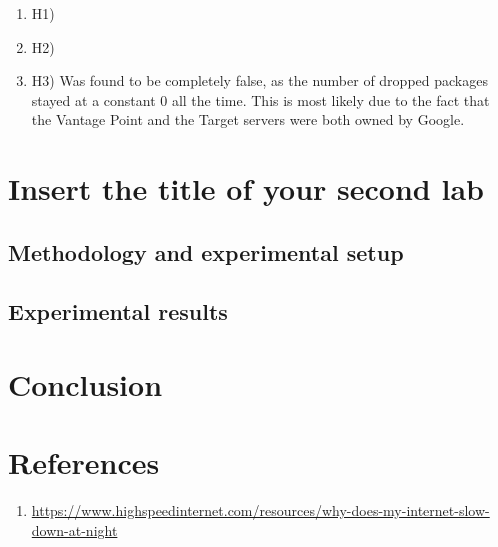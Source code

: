 \documentclass[a4paper,10pt]{article}
\begin{document}
\begin{enumerate}

\item H1)

\item H2)

\item H3) Was found to be completely false, as the number of dropped packages stayed at a constant 0 all the time. This is most likely due to the fact that the Vantage Point and the Target servers were both owned by Google.

\end{enumerate}



\section{Insert the title of your second lab}
\subsection{Methodology and experimental setup}
\subsection{Experimental results}
\section{Conclusion}


\clearpage

\section{References}


\begin{enumerate}

\item \label{article1}  \url{https://www.highspeedinternet.com/resources/why-does-my-internet-slow-down-at-night} 

\end{enumerate}
\end{document}
